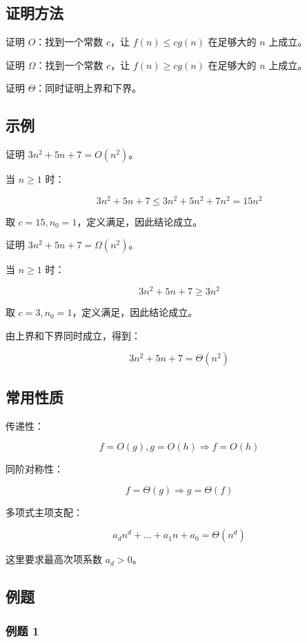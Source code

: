\documentclass[UTF8,zihao=-4]{ctexart}
\begin{document}
\subsection*{证明方法}

证明 $O$：找到一个常数 $c$，让 $f(n) \le c g(n)$ 在足够大的 $n$ 上成立。

证明 $\Omega$：找到一个常数 $c$，让 $f(n) \ge c g(n)$ 在足够大的 $n$ 上成立。

证明 $\Theta$：同时证明上界和下界。

\subsection*{示例}

证明 $3n^2 + 5n + 7 = O(n^2)$。

当 $n \ge 1$ 时：

\[3n^{2} + 5n + 7 \le  3n^{2} + 5n^{2} + 7n^{2} = 15n^{2}\]

取 $c = 15, n_0 = 1$，定义满足，因此结论成立。

证明 $3n^2 + 5n + 7 = \Omega(n^2)$。

当 $n \ge 1$ 时：

\[3n^{2} + 5n + 7 \ge  3n^{2}\]

取 $c = 3, n_0 = 1$，定义满足，因此结论成立。

由上界和下界同时成立，得到：

\[3n^{2} + 5n + 7 = \Theta(n^{2})\]

\subsection*{常用性质}

传递性：

\[f = O(g), g = O(h) \Rightarrow  f = O(h)\]

同阶对称性：

\[f = \Theta(g) \Rightarrow  g = \Theta(f)\]

多项式主项支配：

\[a_d n^{d} + ... + a_{1} n + a_{0} = \Theta(n^{d})\]

这里要求最高次项系数 $a_d > 0$。

\subsection*{例题}

\subsubsection*{例题 1}
\end{document}
